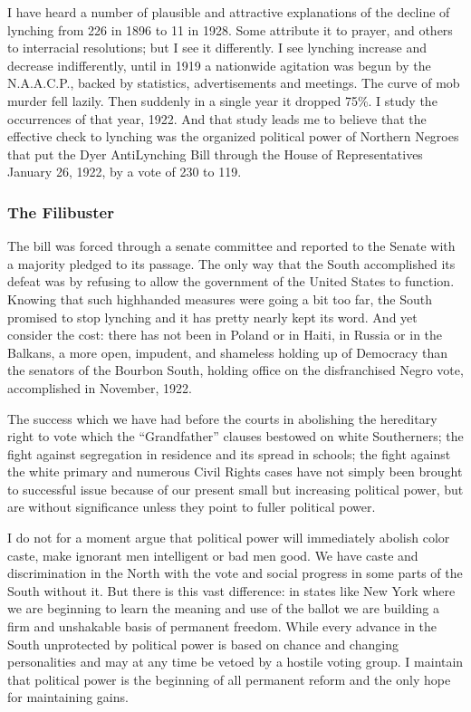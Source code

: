 \documentclass[letterpaper,10pt,english]{jupyterBook}
\begin{document}
\sphinxAtStartPar
I have heard a number of plausible and attractive explanations of the decline of lynching from 226 in 1896 to 11 in 1928. Some attribute it to prayer, and others to inter\sphinxhyphen{}racial resolutions; but I see it differently. I see lynching increase and decrease indifferently, until in 1919 a nationwide agitation was begun by the N.A.A.C.P., backed by statistics, advertisements and meetings. The curve of mob murder fell lazily. Then suddenly in a single year it dropped 75\%. I study the occurrences of that year, 1922. And that study leads me to believe that the effective check to lynching was the organized political power of Northern Negroes that put the Dyer Anti\sphinxhyphen{}Lynching Bill through the House of Representatives January 26, 1922, by a vote of 230 to 119.


\subsubsection{The Filibuster}
\label{\detokenize{Volumes/36/05/negro_citizen:the-filibuster}}
\sphinxAtStartPar
The bill was forced through a senate committee and reported to the Senate with a majority pledged to its passage. The only way that the South accomplished its defeat was by refusing to allow the government of the United States to function. Knowing that such high\sphinxhyphen{}handed measures were going a bit too far, the South promised to stop lynching and it has pretty nearly kept its word. And yet consider the cost: there has not been in Poland or in Haiti, in Russia or in the Balkans, a more open, impudent, and shameless holding up of Democracy than the senators of the Bourbon South, holding office on the disfranchised Negro vote, accomplished in November, 1922.

\sphinxAtStartPar
The success which we have had before the courts in abolishing the hereditary right to vote which the “Grandfather” clauses bestowed on white Southerners; the fight against segregation in residence and its spread in schools; the fight against the white primary and numerous Civil Rights cases have not simply been brought to successful issue because of our present small but increasing political power, but are without significance unless they point to fuller political power.

\sphinxAtStartPar
I do not for a moment argue that political power will immediately abolish color caste, make ignorant men intelligent or bad men good. We have caste and discrimination in the North with the vote and social progress in some parts of the South without it. But there is this vast difference: in states like New York where we are beginning to learn the meaning and use of the ballot we are building a firm and unshakable basis of permanent freedom. While every advance in the South unprotected by political power is based on chance and changing personalities and may at any time be vetoed by a hostile voting group. I maintain that political power is the beginning of all permanent reform and the only hope for maintaining gains.
\end{document}
